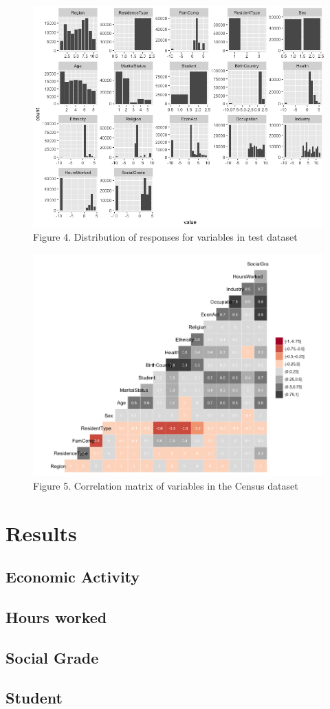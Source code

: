 \documentclass[]{book}
\begin{document}
\begin{figure}
\centering
\includegraphics{images/dist_test.png}
\caption{Figure 4. Distribution of responses for variables in test
dataset}
\end{figure}

\begin{figure}
\centering
\includegraphics{images/corr_all.png}
\caption{Figure 5. Correlation matrix of variables in the Census
dataset}
\end{figure}

\chapter{Results}\label{results-1}

\section{Economic Activity}\label{economic-activity}

\section{Hours worked}\label{hours-worked}

\section{Social Grade}\label{social-grade}

\section{Student}\label{student}


\end{document}
